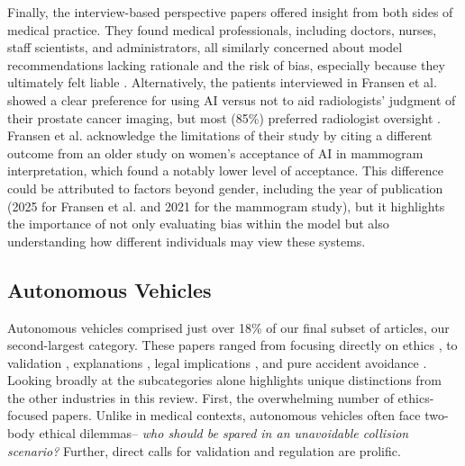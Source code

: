 \documentclass[authoryear,preprint,12pt]{elsarticle}
\begin{document}
Finally, the interview-based perspective papers offered insight from both sides
of medical practice. They found medical professionals, including doctors,
nurses, staff scientists, and administrators, all similarly concerned about
model recommendations lacking rationale and the risk of bias, especially because
they ultimately felt liable
\cite{nouisEvaluatingAccountabilityTransparency2025, kingPotentialUsesAI2023}. Alternatively, the patients interviewed in
Fransen et al. \cite{fransenPatientPerspectivesUse2025} showed a clear
preference for using AI versus not to aid radiologists' judgment of their
prostate cancer imaging, but most (85\%) preferred radiologist oversight
\cite{fransenPatientPerspectivesUse2025}. Fransen et al.
\cite{fransenPatientPerspectivesUse2025} acknowledge the limitations of their
study by citing a different outcome from an older study on women's acceptance of
AI in mammogram interpretation, which found a notably lower level of acceptance.
This difference could be attributed to factors beyond gender, including the year
of publication (2025 for Fransen et al. and 2021 for the mammogram study), but
it highlights the importance of not only evaluating bias within the model but
also understanding how different individuals may view these systems.

\subsection{Autonomous Vehicles}
Autonomous vehicles comprised just over 18\% of our final subset of articles,
our second-largest category. These papers ranged from focusing directly on
ethics 
\cite{eggertAutonomisedHarming2025, guensbergAutomatedVehiclesDilution2022,geisslingerEthicalTrajectoryPlanning2023,bertheauEventrelatedPotentialsReveal2025}, to validation
\cite{yangPredictionFailureRiskaware2023, jiAcceleratedTestingEvaluation2025}, explanations
\cite{fengNLEDMNaturallanguageExplanations2023,kanekoPredictingTrustDynamics2025}, legal implications
\cite{maLegalDecisionmakingHighway2023, tianHowShouldAutonomous2025}, and
pure accident avoidance \cite{goodallComparisonAutomatedVehicle2021,luPhysicsinformedAttentionModel2025, yuanActiveTakeoverFailure2026}. Looking broadly at the subcategories alone
highlights unique distinctions from the other industries in this review. First,
the overwhelming number of ethics-focused papers. Unlike in medical contexts,
autonomous vehicles often face two-body ethical dilemmas-- \textit{who should be
spared in an unavoidable collision scenario?} Further, direct calls for
validation and regulation are prolific. 
\end{document}
